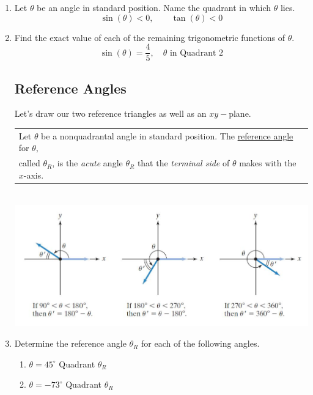 \begin{enumerate}
\item Let $\theta$ be an angle in standard position.  Name the
  quadrant in which $\theta$ lies.
$$\sin(\theta)<0, \quad \quad \tan(\theta)<0$$


\newpage

\item Find the exact value of each of the remaining trigonometric functions of $\theta$.
$$\sin(\theta)=\frac{4}{5}, \quad  \theta \text{ in Quadrant 2}$$\vfill


\subsection{Reference Angles} 

Let's draw our two reference triangles as well as an $xy-$plane.\\[1.5in]
\hspace{-.3in}\begin{tabular}{| l |} \hline
Let $\theta$ be a nonquadrantal angle in standard position. The \underline{reference angle} for $\theta$, \\ called $\theta_R$, is the \emph{acute} angle $\theta_R$ that the \emph{terminal side} of $\theta$ makes with the $x$-axis. \\ \hline
\end{tabular}\\
\includegraphics{refimage}\\

\newpage

\item Determine the reference angle $\theta_R$ for each of the following angles.
\begin{enumerate}
\item $\theta = 45^\circ$ \hspace{1in} Quadrant \underline{\phantom{sldkjfslkdjf}} \hspace{1in} $\theta_R$ \underline{\phantom{sldkjfslkdjf}} \\[.8in]
\item $\theta = -73^\circ$ \hspace{1in} Quadrant \underline{\phantom{sldkjfslkdjf}} \hspace{1in} $\theta_R$ \underline{\phantom{sldkjfslkdjf}}  \\[.8in]


\end{enumerate}
\end{enumerate}
